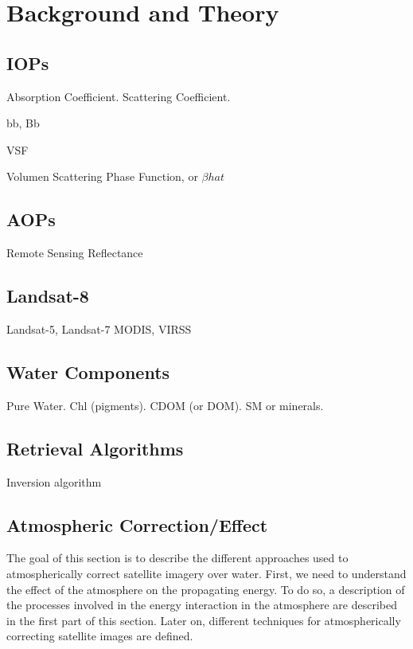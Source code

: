\chapter{ Background and Theory}
\label{ch:background}
\section{ IOPs}

Absorption Coefficient.
Scattering Coefficient.

bb, Bb

VSF

Volumen Scattering Phase Function, or $\beta{hat}$ 
\section{ AOPs}
Remote Sensing Reflectance
\section{ Landsat-8}
Landsat-5, Landsat-7
MODIS, VIRSS
\section{ Water Components}
Pure Water. Chl (pigments). CDOM (or DOM). SM or minerals.
\section{Retrieval Algorithms}
Inversion algorithm 

\section{Atmospheric Correction/Effect} 
The goal of this section is to describe the different approaches used to atmospherically correct satellite imagery over water. First, we need to understand the effect of the atmosphere on the propagating energy. To do so, a description of the processes involved in the energy interaction in the atmosphere are described in the first part of this section. Later on, different techniques for atmospherically correcting satellite images are defined.


